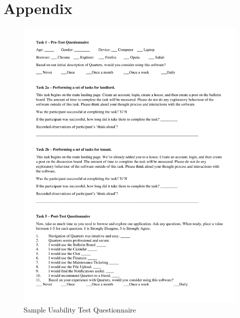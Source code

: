 \documentclass[12pt]{article}
\begin{document}
\section{Appendix}
\begin{figure}[h]
    \centering
    \includegraphics[width=1\textwidth]{usabilityTest.pdf}
    \caption{Sample Usability Test Questionnaire}
    \label{fig:test}
\end{figure}
\end{document}
